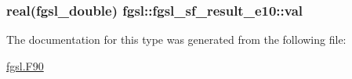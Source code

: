 \subsubsection[{val}]{\setlength{\rightskip}{0pt plus 5cm}real({\bf fgsl\+\_\+double}) fgsl\+::fgsl\+\_\+sf\+\_\+result\+\_\+e10\+::val}\label{structfgsl_1_1fgsl__sf__result__e10_a5b7c6b37adb7724bdf69637b74f65395}


The documentation for this type was generated from the following file\+:\begin{DoxyCompactItemize}
\item 
\hyperlink{fgsl_8F90}{fgsl.\+F90}\end{DoxyCompactItemize}

